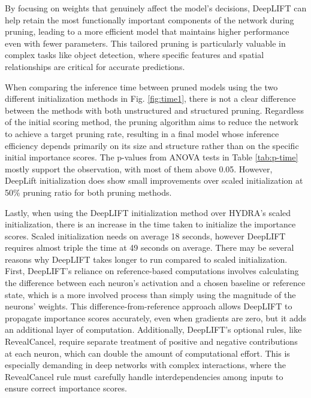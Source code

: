 \documentclass[journal,onecolumn,12pt]{IEEEtran}
\begin{document}
By focusing on weights that genuinely affect the model’s decisions, DeepLIFT can help retain the most functionally important components of the network during pruning, leading to a more efficient model that maintains higher performance even with fewer parameters. This tailored pruning is particularly valuable in complex tasks like object detection, where specific features and spatial relationships are critical for accurate predictions.

When comparing the inference time between pruned models using the two different initialization methods in Fig. \ref{fig:time1}, there is not a clear difference between the methods with both unstructured and structured pruning. Regardless of the initial scoring method, the pruning algorithm aims to reduce the network to achieve a target pruning rate, resulting in a final model whose inference efficiency depends primarily on its size and structure rather than on the specific initial importance scores. The p-values from ANOVA tests in Table \ref{tab:p-time} mostly support the observation, with most of them above 0.05. However, DeepLift initialization does show small improvements over scaled initialization at 50\% pruning ratio for both pruning methods. 

Lastly, when using the DeepLIFT initialization method over HYDRA's scaled initialization, there is an increase in the time taken to initialize the importance scores. Scaled initialization needs on average 18 seconds, however DeepLIFT requires almost triple the time at 49 seconds on average. There may be several reasons why DeepLIFT takes longer to run compared to scaled initialization. First, DeepLIFT’s reliance on reference-based computations involves calculating the difference between each neuron’s activation and a chosen baseline or reference state, which is a more involved process than simply using the magnitude of the neurons' weights. This difference-from-reference approach allows DeepLIFT to propagate importance scores accurately, even when gradients are zero, but it adds an additional layer of computation. Additionally, DeepLIFT’s optional rules, like RevealCancel, require separate treatment of positive and negative contributions at each neuron, which can double the amount of computational effort. This is especially demanding in deep networks with complex interactions, where the RevealCancel rule must carefully handle interdependencies among inputs to ensure correct importance scores. 
\end{document}
